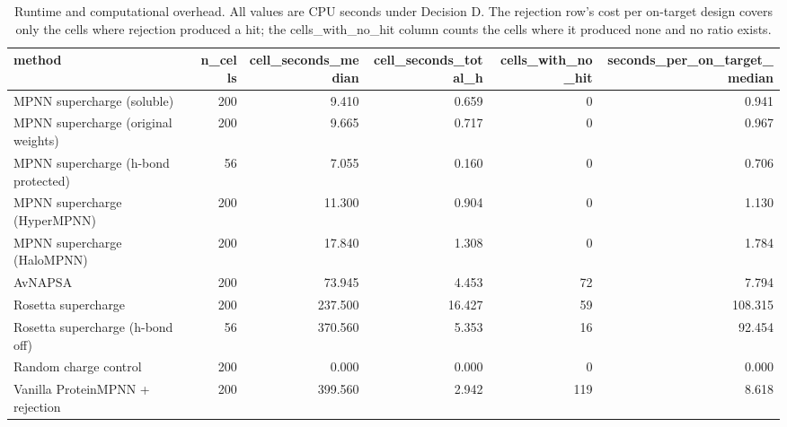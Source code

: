 \begin{table}
\caption{Runtime and computational overhead. All values are CPU seconds under Decision D. The rejection row's cost per on-target design covers only the cells where rejection produced a hit; the cells_with_no_hit column counts the cells where it produced none and no ratio exists.}
\label{tab:T5_runtime}
\begin{tabular}{lrrrrr}
\toprule
method & n\_cells & cell\_seconds\_median & cell\_seconds\_total\_h & cells\_with\_no\_hit & seconds\_per\_on\_target\_median \\
\midrule
MPNN supercharge (soluble) & 200 & 9.410 & 0.659 & 0 & 0.941 \\
MPNN supercharge (original weights) & 200 & 9.665 & 0.717 & 0 & 0.967 \\
MPNN supercharge (h-bond protected) & 56 & 7.055 & 0.160 & 0 & 0.706 \\
MPNN supercharge (HyperMPNN) & 200 & 11.300 & 0.904 & 0 & 1.130 \\
MPNN supercharge (HaloMPNN) & 200 & 17.840 & 1.308 & 0 & 1.784 \\
AvNAPSA & 200 & 73.945 & 4.453 & 72 & 7.794 \\
Rosetta supercharge & 200 & 237.500 & 16.427 & 59 & 108.315 \\
Rosetta supercharge (h-bond off) & 56 & 370.560 & 5.353 & 16 & 92.454 \\
Random charge control & 200 & 0.000 & 0.000 & 0 & 0.000 \\
Vanilla ProteinMPNN + rejection & 200 & 399.560 & 2.942 & 119 & 8.618 \\
\bottomrule
\end{tabular}
\end{table}
